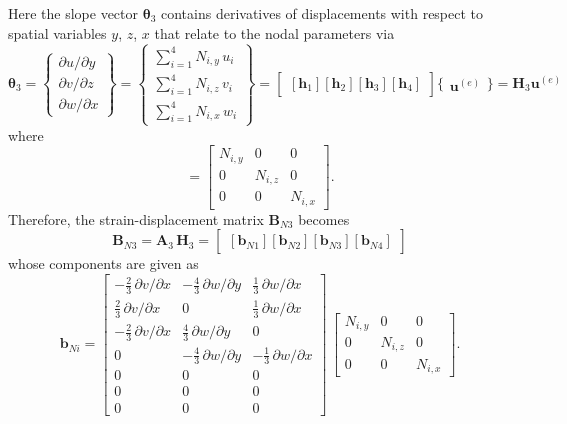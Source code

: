 Here the slope vector $\boldsymbol{\theta}_3$ contains derivatives of displacements with respect to spatial variables $y$, $z$, $x$ that relate to the nodal parameters via
\small
\begin{equation}
\boldsymbol{\theta}_3 =  \begin{Bmatrix}
\partial u / \partial y\\
\partial v / \partial z \\
\partial w / \partial x
\end{Bmatrix}
= \begin{Bmatrix}
\sum\nolimits_{i=1}^4 N_{i,y} \, u_i\\
\sum\nolimits_{i=1}^4 N_{i,z} \, v_i \\
\sum\nolimits_{i=1}^4 N_{i,x} \, w_i
\end{Bmatrix} 
= \begin{bmatrix}
[\mathbf{h}_1] [\mathbf{h}_2] [\mathbf{h}_3] [\mathbf{h}_4] 
\end{bmatrix} \bigl\{ \begin{matrix} \mathbf{u}^{(e)} \end{matrix} \bigr\}
= \mathbf{H}_3 \mathbf{u}^{(e)}
\end{equation}
\normalsize
where 
\begin{equation}
[\mathbf{h}_i] = \begin{bmatrix}
N_{i,y} &  0 & 0  \\
0 & N_{i,z} & 0  \\
0 & 0 & N_{i,x} \end{bmatrix}. 
\end{equation}
Therefore, the strain-displacement matrix $\mathbf{B}_{N3}$ becomes
\begin{equation}
\mathbf{B}_{N3} = \mathbf{A}_3 \, \mathbf{H}_3 = \begin{bmatrix}
[\mathbf{b}_{N1}] [\mathbf{b}_{N2}] [\mathbf{b}_{N3}] [\mathbf{b}_{N4}]
\end{bmatrix} 
\end{equation}
whose components are given as
\begin{equation}
\mathbf{b}_{Ni} = \begin{bmatrix}
	- \tfrac{2}{3} \, \partial v / \partial x &  - \tfrac{4}{3} \, \partial w / \partial y &  \tfrac{1}{3} \, \partial w / \partial x   \\
	\tfrac{2}{3} \, \partial v / \partial x &  0 & \tfrac{1}{3} \, \partial w / \partial x  \\
	- \tfrac{2}{3} \, \partial v / \partial x & \tfrac{4}{3} \, \partial w / \partial y & 0 \\
	0 &  - \tfrac{4}{3} \, \partial w / \partial y & - \tfrac{1}{3} \, \partial w / \partial x \\
	0 &  0 & 0  \\
	0 &  0 & 0  \\
	0 &  0 & 0  \end{bmatrix} \, \begin{bmatrix}
N_{i,y} &  0 & 0  \\
0 & N_{i,z} & 0  \\
0 & 0 & N_{i,x}  \end{bmatrix}.
\end{equation}

